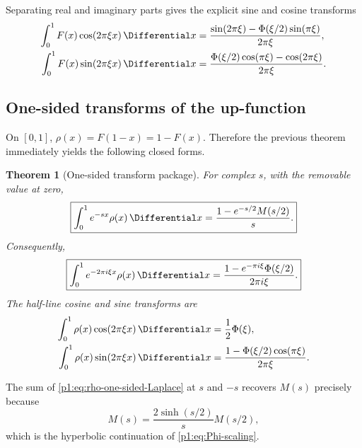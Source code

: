 \documentclass[11pt]{article}
\newtheorem{theorem}{Theorem}[section]
\theoremstyle{definition}
\theoremstyle{remark}
\begin{document}
Separating real and imaginary parts gives the explicit sine and cosine transforms
\begin{align}
 \int_0^1F(x)\cos(2\pi\xi x)\,\Differential x
 &=\frac{\sin(2\pi\xi)-\Phi(\xi/2)\sin(\pi\xi)}{2\pi\xi},    \label{p1:eq:F-cosine-transform}\\
 \int_0^1F(x)\sin(2\pi\xi x)\,\Differential x
 &=\frac{\Phi(\xi/2)\cos(\pi\xi)-\cos(2\pi\xi)}{2\pi\xi}. \label{p1:eq:F-sine-transform}
\end{align}

\subsection{One-sided transforms of the up-function}

On \([0,1]\), \(\rho(x)=F(1-x)=1-F(x)\).  Therefore the previous theorem immediately
yields the following closed forms.

\begin{theorem}[One-sided transform package]\label{p1:thm:one-sided}
For complex \(s\), with the removable value at zero,
\begin{equation}
 \boxed{
 \int_0^1e^{-sx}\rho(x)\,\Differential x
 =\frac{1-e^{-s/2}M(s/2)}{s}.
 }                                                           \label{p1:eq:rho-one-sided-Laplace}
\end{equation}
Consequently,
\begin{equation}
 \boxed{
 \int_0^1e^{-2\pi i\xi x}\rho(x)\,\Differential x
 =\frac{1-e^{-\pi i\xi}\Phi(\xi/2)}{2\pi i\xi}.
 }                                                           \label{p1:eq:rho-one-sided-Fourier}
\end{equation}
The half-line cosine and sine transforms are
\begin{align}
 \int_0^1\rho(x)\cos(2\pi\xi x)\,\Differential x
 &=\frac12\Phi(\xi),                                        \label{p1:eq:rho-half-cos}\\
 \int_0^1\rho(x)\sin(2\pi\xi x)\,\Differential x
 &=\frac{1-\Phi(\xi/2)\cos(\pi\xi)}{2\pi\xi}.             \label{p1:eq:rho-half-sin}
\end{align}
\end{theorem}

The sum of \eqref{p1:eq:rho-one-sided-Laplace} at \(s\) and \(-s\) recovers
\(M(s)\) precisely because
\begin{equation}
 M(s)=\frac{2\sinh(s/2)}{s}M(s/2),                           \label{p1:eq:M-scaling}
\end{equation}
which is the hyperbolic continuation of \eqref{p1:eq:Phi-scaling}.
\end{document}
